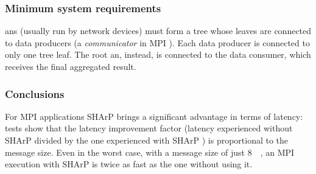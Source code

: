 \subsubsection{Minimum system requirements}
\glspl{an} (usually run by network devices) must form a tree whose leaves are connected to data producers (a \textit{communicator} in MPI \cite{mpi}).
Each data producer is connected to only one tree leaf.
The root \gls{an}, instead, is connected to the data consumer, which receives the final aggregated result.

\subsubsection{Conclusions}
For MPI \cite{mpi} applications SHArP \cite{sharp} brings a significant advantage in terms of latency: tests show that the latency improvement factor (latency experienced without SHArP \cite{sharp} divided by the one experienced with SHArP \cite{sharp}) is proportional to the message size.
Even in the worst case, with a message size of just \SI{8}{\mega\byte}, an MPI \cite{mpi} execution with SHArP \cite{sharp} is twice as fast as the one without using it.